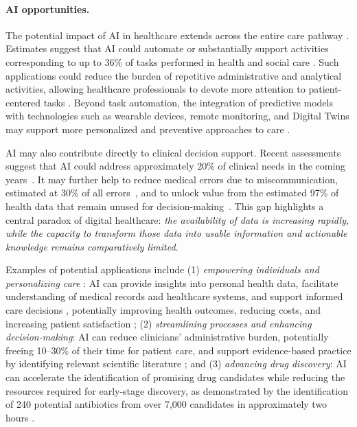 \paragraph{AI opportunities.}

The potential impact of AI in healthcare extends across the entire care pathway \cite{oecd_progress_2026}. Estimates suggest that AI could automate or substantially support activities corresponding to up to 36\% of tasks performed in health and social care \cite{kumar_chebrolu_smart_2020}. Such applications could reduce the burden of repetitive administrative and analytical activities, allowing healthcare professionals to devote more attention to patient-centered tasks \cite{oecd_progress_2026, hamon_robustness_2020}. Beyond task automation, the integration of predictive models with technologies such as wearable devices, remote monitoring, and Digital Twins may support more personalized and preventive approaches to care \cite{oecd_progress_2026}.

AI may also contribute directly to clinical decision support. Recent assessments suggest that AI could address approximately 20\% of clinical needs in the coming years~\cite{gonzalez-gonzalo_trustworthy_2022}. It may further help to reduce medical errors due to miscommunication, estimated at 30\% of all errors~\cite{european_alliance_for_access_to_safe_medicines_medication_2022}, and to unlock value from the estimated 97\% of health data that remain unused for decision-making~\cite{oecd_collective_2024}. This gap highlights a central paradox of digital healthcare: \emph{the availability of data is increasing rapidly, while the capacity to transform those data into usable information and actionable knowledge remains comparatively limited}.

Examples of potential applications include (1) \emph{empowering individuals and personalizing care} \cite{oecd_collective_2024}: AI can provide insights into personal health data, facilitate understanding of medical records and healthcare systems, and support informed care decisions \cite{krumholz_big_2014,topol_high-performance_2019}, potentially improving health outcomes, reducing costs, and increasing patient satisfaction \cite{hibbard_what_2013}; (2) \emph{streamlining processes and enhancing decision-making}: AI can reduce clinicians' administrative burden, potentially freeing 10--30\% of their time for patient care, and support evidence-based practice by identifying relevant scientific literature \cite{shanafelt_potential_2016,oecd_collective_2024}; and (3) \emph{advancing drug discovery}: AI can accelerate the identification of promising drug candidates while reducing the resources required for early-stage discovery, as demonstrated by the identification of 240 potential antibiotics from over 7,000 candidates in approximately two hours \cite{liu_deep_2023}.


